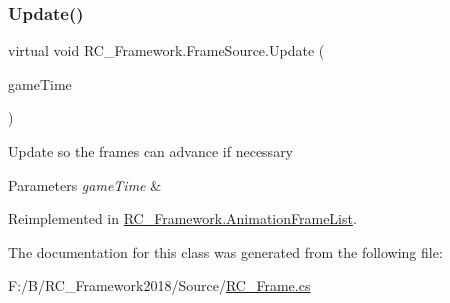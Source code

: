\subsubsection{\texorpdfstring{Update()}{Update()}}
{\footnotesize\ttfamily virtual void R\+C\+\_\+\+Framework.\+Frame\+Source.\+Update (\begin{DoxyParamCaption}\item[{Game\+Time}]{game\+Time }\end{DoxyParamCaption})\hspace{0.3cm}{\ttfamily [virtual]}}



Update so the frames can advance if necessary 


\begin{DoxyParams}{Parameters}
{\em game\+Time} & \\
\hline
\end{DoxyParams}


Reimplemented in \mbox{\hyperlink{class_r_c___framework_1_1_animation_frame_list_ad6d3b045da01a972a32f48ae7b7c7598}{R\+C\+\_\+\+Framework.\+Animation\+Frame\+List}}.



The documentation for this class was generated from the following file\+:\begin{DoxyCompactItemize}
\item 
F\+:/\+B/\+R\+C\+\_\+\+Framework2018/\+Source/\mbox{\hyperlink{_r_c___frame_8cs}{R\+C\+\_\+\+Frame.\+cs}}\end{DoxyCompactItemize}
